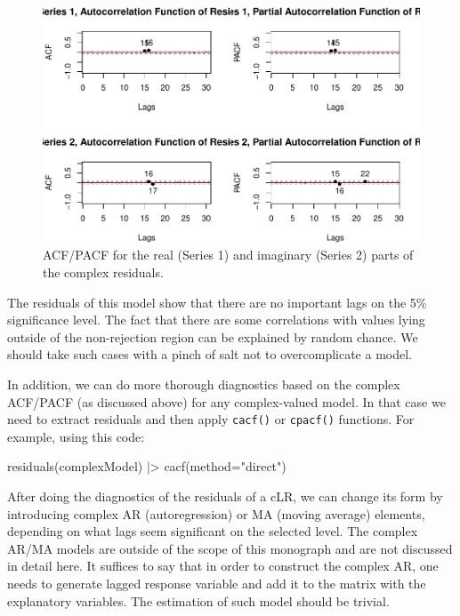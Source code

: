 \documentclass[
]{book}
\newenvironment{Shaded}{\begin{snugshade}}{\end{snugshade}}
\newcommand{\AttributeTok}[1]{\textcolor[rgb]{0.77,0.63,0.00}{#1}}
\newcommand{\FunctionTok}[1]{\textcolor[rgb]{0.00,0.00,0.00}{#1}}
\newcommand{\NormalTok}[1]{#1}
\newcommand{\SpecialCharTok}[1]{\textcolor[rgb]{0.00,0.00,0.00}{#1}}
\newcommand{\StringTok}[1]{\textcolor[rgb]{0.31,0.60,0.02}{#1}}
\begin{document}
\begin{figure}
\centering
\includegraphics{Svetunkov---Svetunkov---Complex-Valued-Econometrics_files/figure-latex/complexARDiagnosticsACFPACF-1.pdf}
\caption{\label{fig:complexARDiagnosticsACFPACF}ACF/PACF for the real (Series 1) and imaginary (Series 2) parts of the complex residuals.}
\end{figure}

The residuals of this model show that there are no important lags on the 5\% significance level. The fact that there are some correlations with values lying outside of the non-rejection region can be explained by random chance. We should take such cases with a pinch of salt not to overcomplicate a model.

In addition, we can do more thorough diagnostics based on the complex ACF/PACF (as discussed above) for any complex-valued model. In that case we need to extract residuals and then apply \texttt{cacf()} or \texttt{cpacf()} functions. For example, using this code:

\begin{Shaded}
\begin{Highlighting}[]
\FunctionTok{residuals}\NormalTok{(complexModel) }\SpecialCharTok{|\textgreater{}}
    \FunctionTok{cacf}\NormalTok{(}\AttributeTok{method=}\StringTok{"direct"}\NormalTok{)}
\end{Highlighting}
\end{Shaded}

After doing the diagnostics of the residuals of a cLR, we can change its form by introducing complex AR (autoregression) or MA (moving average) elements, depending on what lags seem significant on the selected level. The complex AR/MA models are outside of the scope of this monograph and are not discussed in detail here. It suffices to say that in order to construct the complex AR, one needs to generate lagged response variable and add it to the matrix with the explanatory variables. The estimation of such model should be trivial.
\end{document}
